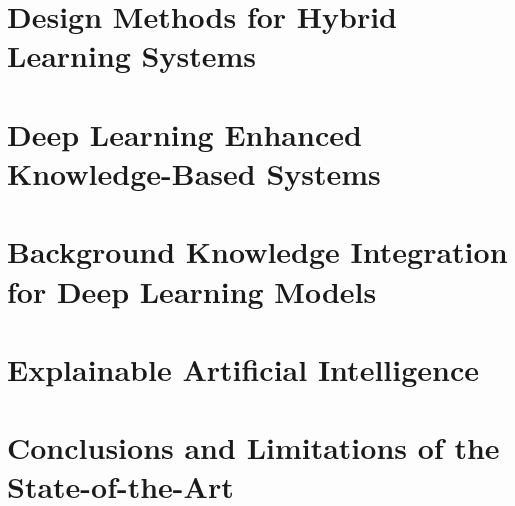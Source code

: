 

\section{Design Methods for Hybrid Learning Systems}



\section{Deep Learning Enhanced Knowledge-Based Systems}

\section{Background Knowledge Integration for Deep Learning Models}

\section{Explainable Artificial Intelligence}

\section{Conclusions and Limitations of the State-of-the-Art}
